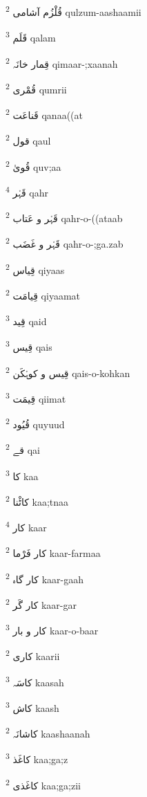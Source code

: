 \documentclass[12pt]{article}
\begin{document}
\begin{multicols}{5}
{\ur قُلْزُم آشامی}   \textsuperscript{2} qulzum-aashaamii

{\ur قَلَم}   \textsuperscript{3} qalam

{\ur قِمار خانَہ}   \textsuperscript{2} qimaar-;xaanah

{\ur قُمْری}   \textsuperscript{2} qumrii

{\ur قَناعَت}   \textsuperscript{2} qanaa((at

{\ur قول}   \textsuperscript{2} qaul

{\ur قُویٰ}   \textsuperscript{2} quv;aa

{\ur قَہْر}   \textsuperscript{4} qahr

{\ur قَہْر و عَتاب}   \textsuperscript{2} qahr-o-((ataab

{\ur قَہْر و غَضَب}   \textsuperscript{2} qahr-o-;ga.zab

{\ur قِیاس}   \textsuperscript{2} qiyaas

{\ur قِیامَت}   \textsuperscript{2} qiyaamat

{\ur قِید}   \textsuperscript{3} qaid

{\ur قِیس}   \textsuperscript{3} qais

{\ur قِیس و کوہْکَن}   \textsuperscript{2} qais-o-kohkan

{\ur قِیمَت}   \textsuperscript{3} qiimat

{\ur قُیُود}   \textsuperscript{2} quyuud

{\ur قے}   \textsuperscript{2} qai

{\ur کا}   \textsuperscript{3} kaa

{\ur کاٹْنا}   \textsuperscript{2} kaa;tnaa

{\ur کار}   \textsuperscript{4} kaar

{\ur کار فَرْما}   \textsuperscript{2} kaar-farmaa

{\ur کار گاہ}   \textsuperscript{2} kaar-gaah

{\ur کار گَر}   \textsuperscript{2} kaar-gar

{\ur کار و بار}   \textsuperscript{3} kaar-o-baar

{\ur کاری}   \textsuperscript{2} kaarii

{\ur کاسَہ}   \textsuperscript{3} kaasah

{\ur کاش}   \textsuperscript{3} kaash

{\ur کاشانَہ}   \textsuperscript{2} kaashaanah

{\ur کاغَذ}   \textsuperscript{3} kaa;ga;z

{\ur کاغَذی}   \textsuperscript{2} kaa;ga;zii


\end{multicols}
\end{document}

